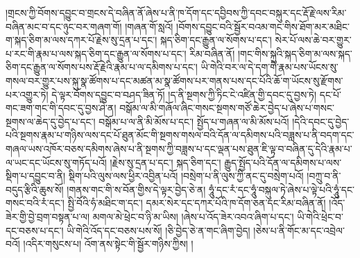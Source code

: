 །གྲངས་ཀྱི་བོགས་དབྱུང་བ་གྲངས་དེ་བཞིན་ནོ་ཞེས་པ་ནི་ཁ་དོག་དང་དབྱིབས་ཀྱི་དབང་བསྐུར་དང་རྡོ་རྗེ་ལས་རིམ་བཞིན་མང་བ་དང་ཉུང་བར་གཞག་གོ། །གཞན་གོ་སླའོ། །བོགས་དབྱུང་བའི་སྦྱོར་བའམ་གང་གིས་ཐོག་མར་མཐིང་ག་སྐད་ཅིག་མ་ལས་དཀར་པོ་རྗེས་སུ་དྲན་པ་དང་། སྐད་ཅིག་དང་རྒྱུན་ལ་སོགས་པ་དང་། སེར་པོ་ལས་ཆེ་བར་གྱུར་པ་རང་གི་རྣམ་པ་ལས་སྐད་ཅིག་དང་རྒྱུན་ལ་སོགས་པ་དང་། རིམ་བཞིན་ནོ། །གང་གིས་སྐུའི་སྐད་ཅིག་མ་ལས་སྐད་ཅིག་དང་རྒྱུན་ལ་སོགས་པས་རྡོ་རྗེའི་རྣམ་པ་ལ་དམིགས་པ་དང་། ཡི་གེའི་བར་ལ་དེ་དག་གི་རྣམ་པས་ཡོངས་སུ་གསལ་​ བར་གྱུར་པས་སྐུ་སྣ་ཚོགས་པ་དང་མཚན་མ་སྣ་ཚོགས་པར་གནས་པས་དང་པོའི་ཆོ་ག་ཡོངས་སུ་རྫོགས་པར་འགྱུར་ཏེ། དེ་ལྟར་བོགས་དབྱུང་བ་བཤད་ཟིན་ཏོ། །ད་ནི་སྔགས་ཀྱི་ཏིང་ངེ་འཛིན་གྱི་དབང་དུ་བྱས་ཏེ། དང་པོ་གང་ཟག་གང་གི་དབང་དུ་བྱས་ཤེ་ན། བསྒོམ་ལ་མི་གཞོལ་ཞིང་གསང་སྔགས་གཙོ་ཆེར་བྱེད་པ་ཞེས་པ་གསང་སྔགས་ལ་ཆེད་དུ་བྱེད་པ་དང་། བསྒོམ་པ་ལ་ནི་མི་མོས་པ་དང་། སྤྱོད་པ་གཞན་ལ་མི་མོས་པའོ། །དེའི་དབང་དུ་བྱེད་པའི་སྔགས་རྣམ་པ་གཉིས་ལས་དང་པོ་ཐུན་མོང་གི་སྔགས་གསལ་བའི་དོན་ལ་དམིགས་པའི་བཟླས་པ་ནི་བདག་དང་གཞལ་ཡས་འཁོར་བཅས་དམིགས་ཞེས་པ་ནི་སྔགས་ཀྱི་བཟླས་པ་དང་ལྡན་པས་ཐུན་ཇི་ལྟ་བ་བཞིན་དུ་དེའི་རྣམ་པ་ལ་ཡང་དང་ཡོངས་སུ་གཏོད་པའོ། །རྗེས་སུ་དྲན་པ་དང་། སྐད་ཅིག་དང་། རྒྱུད་སྤྱོད་པའི་དོན་ལ་དམིགས་པ་ལས་སྡིག་པ་དབྱུང་བ་ནི། སྡིག་པའི་ལུས་ལས་ཕྱིར་འབྱིན་པའོ། །བསྲེག་པ་ནི་ལུས་ཀྱི་ནང་དུ་བསྲེག་པའོ། །བཀྲུ་བ་ནི་བདུད་རྩིའི་ཆུས་སོ། །གནས་གང་གི་ས་བོན་གྱིས་དེ་ལྟར་བྱེད་ཅེ་ན། ཧཱུཾ་དང་རཾ་དང་ཧཱུཾ་བསྐུལ་ཏེ་ཞེས་པ་ལྟེ་པའི་ཧཱུཾ་དང་གསང་བའི་རཾ་དང་། སྤྱི་བོའི་ཧཾ་མཐིང་ག་དང་། དམར་སེར་དང་དཀར་པོའི་ཁ་དོག་ཅན་དང་རིམ་བཞིན་ནོ། །འོད་ཟེར་གྱི་བྱེ་བྲག་བསྟན་པ་ལ། མགལ་མེ་ཕྲེང་བ་ཉི་མ་ཡིས། །ཞེས་པ་འོད་ཟེར་འབའ་ཞིག་པ་དང་། ཡི་གེའི་ཕྲེང་བ་དང་བཅས་པ་དང་། ཡི་གེའི་འོད་དང་བཅས་པས་སོ། །ཅི་བྱེད་ཅེ་ན་གང་ཞིག་བྱེད། །ཅེས་པ་ནི་གོང་མ་དང་འབྲེལ་བའོ། །འདིར་གསུངས་པ། འོག་ནས་སྟེང་གི་སྦྱོར་གཉིས་ཀྱིས། །

